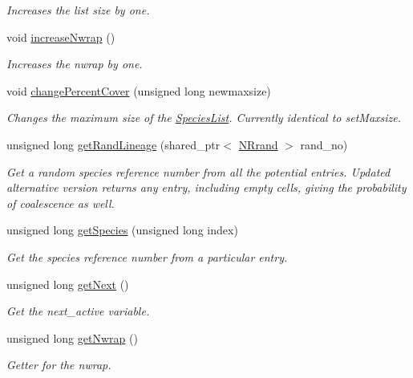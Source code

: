 \begin{DoxyCompactItemize}
\begin{DoxyCompactList}\small\item\em Increases the list size by one. \end{DoxyCompactList}\item 
void \hyperlink{class_species_list_aa9e64b4e922b43c17e188ca2038cb18a}{increase\+Nwrap} ()
\begin{DoxyCompactList}\small\item\em Increases the nwrap by one. \end{DoxyCompactList}\item 
void \hyperlink{class_species_list_a40206bc9836f394653997a61c1c8617a}{change\+Percent\+Cover} (unsigned long newmaxsize)
\begin{DoxyCompactList}\small\item\em Changes the maximum size of the \hyperlink{class_species_list}{Species\+List}. Currently identical to set\+Maxsize. \end{DoxyCompactList}\item 
unsigned long \hyperlink{class_species_list_a931c33b7672e1e107cd9dc4f08cc218c}{get\+Rand\+Lineage} (shared\+\_\+ptr$<$ \hyperlink{class_n_rrand}{N\+Rrand} $>$ rand\+\_\+no)
\begin{DoxyCompactList}\small\item\em Get a random species reference number from all the potential entries. Updated alternative version returns any entry, including empty cells, giving the probability of coalescence as well. \end{DoxyCompactList}\item 
unsigned long \hyperlink{class_species_list_ab215c2790feb1a721c759bbb1c434f85}{get\+Species} (unsigned long index)
\begin{DoxyCompactList}\small\item\em Get the species reference number from a particular entry. \end{DoxyCompactList}\item 
unsigned long \hyperlink{class_species_list_ac3fffc2d47557af6964cb25336d0e5cc}{get\+Next} ()
\begin{DoxyCompactList}\small\item\em Get the next\+\_\+active variable. \end{DoxyCompactList}\item 
unsigned long \hyperlink{class_species_list_a9cd0acb0d22d6b14c4d58668cdb36af3}{get\+Nwrap} ()
\begin{DoxyCompactList}\small\item\em Getter for the nwrap. \end{DoxyCompactList}\item 

\end{DoxyCompactItemize}
